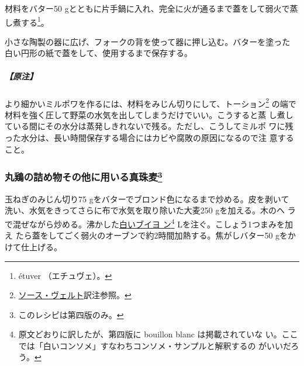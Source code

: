 \begin{recette}
材料をバター50
gとともに片手鍋に入れ、完全に火が通るまで蓋をして弱火で蒸し煮する\footnote{étuver
  （エチュヴェ）。}。

小さな陶製の器に広げ、フォークの背を使って器に押し込む。バターを塗った
白い円形の紙で蓋をして、使用するまで保存する。

\hypertarget{ux539fux6ce8-1}{%
\subparagraph{【原注】}\label{ux539fux6ce8-1}}

より細かいミルポワを作るには、材料をみじん切りにして、トーション\footnote{\protect\hyperlink{sauce-verte}{ソース・ヴェルト}訳注参照。}
の端で材料を強く圧して野菜の水気を出してしまうだけでいい。こうすると蒸
し煮している間にその水分は蒸発しきれないで残る。ただし、こうしてミルポ
ワに残った水分は、長い時間保存する場合にはカビや腐敗の原因になるので注
意すること。

\maeaki

\hypertarget{orge-perle-pour-volailles-farcies}{%
\subsubsection[丸鶏の詰め物その他に用いる真珠麦]{\texorpdfstring{丸鶏の詰め物その他に用いる真珠麦\footnote{このレシピは第四版のみ。}}{丸鶏の詰め物その他に用いる真珠麦}}\label{orge-perle-pour-volailles-farcies}}



玉ねぎのみじん切り75 gをバターでブロンド色になるまで炒める。皮を剥いて
洗い、水気をきってさらに布で水気を取り除いた大麦250 gを加える。木のヘ
ラで混ぜながら炒める。沸かした\protect\hyperlink{consomme-blanc}{白いブイヨ
ン}\footnote{原文どおりに訳したが、第四版に bouillon blanc
  は掲載されていな
  い。ここでは「白いコンソメ」すなわちコンソメ・サンプルと解釈するの
  がいいだろう。}\troisquarts{} Lを注ぐ。こしょう1つまみを加え
たら蓋をしてごく弱火のオーブンで約2時間加熱する。焦がしバター50 gをか
けて仕上げる。
\end{recette}